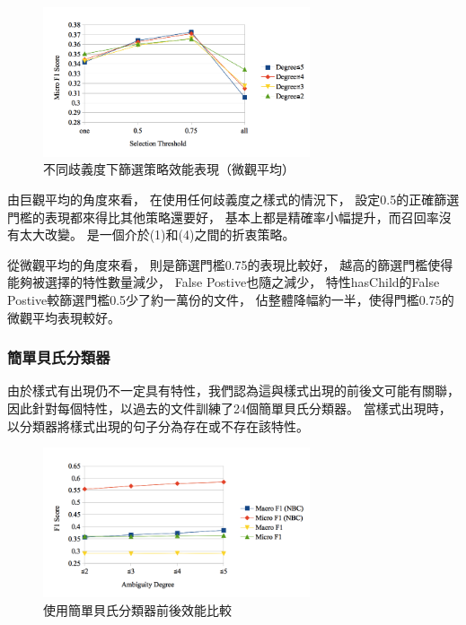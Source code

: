 \begin{figure}
    \centering
    \includegraphics[width=0.7\textwidth]{images/04-micro-nol}
    \caption{不同歧義度下篩選策略效能表現（微觀平均）}
    \label{i:micro-nol}
\end{figure}

由巨觀平均的角度來看，
在使用任何歧義度之樣式的情況下，
設定0.5的正確篩選門檻的表現都來得比其他策略還要好，
基本上都是精確率小幅提升，而召回率沒有太大改變。
是一個介於(1)和(4)之間的折衷策略。

從微觀平均的角度來看，
則是篩選門檻0.75的表現比較好，
越高的篩選門檻使得能夠被選擇的特性數量減少，
False Postive也隨之減少，
特性hasChild的False Postive較篩選門檻0.5少了約一萬份的文件，
佔整體降幅約一半，使得門檻0.75的微觀平均表現較好。

\subsubsection{簡單貝氏分類器}
由於樣式有出現仍不一定具有特性，我們認為這與樣式出現的前後文可能有關聯，
因此針對每個特性，以過去的文件訓練了24個簡單貝氏分類器。
當樣式出現時，以分類器將樣式出現的句子分為存在或不存在該特性。

\begin{figure}[h]
    \centering
    \includegraphics[width=0.7\textwidth]{images/04-nbc}
    \caption{使用簡單貝氏分類器前後效能比較}
    \label{i:nbc}
\end{figure}



